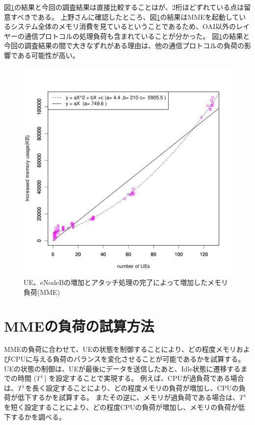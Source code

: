 \documentclass[a4j]{ujarticle}
\begin{document}
図\ref{fig:mme_memory}の結果と今回の調査結果は直接比較することはが、2桁ほどずれている点は留意すべきである。
上野さんに確認したところ、図\ref{fig:mme_memory}の結果はMMEを起動しているシステム全体のメモリ消費を見ているということであるため、OAI以外のレイヤーの通信プロトコルの処理負荷も含まれていることが分かった。
図\ref{fig:mme_memory}の結果と今回の調査結果の間で大きなずれがある理由は、他の通信プロトコルの負荷の影響である可能性が高い。
\begin{figure}[htbp]
  \centering
  \includegraphics[width=0.9\hsize]{mme_memory.pdf}
  \caption{UE、eNodeBの増加とアタッチ処理の完了によって増加したメモリ負荷(MME)}
  \label{fig:mme_memory}
\end{figure}

\clearpage
\section{MMEの負荷の試算方法}
\label{seq:estimate}
MMEの負荷に合わせて、UEの状態を制御することにより、どの程度メモリおよびCPUに与える負荷のバランスを変化させることが可能であるかを試算する。
UEの状態の制御は、UEが最後にデータを送信したあと、Idle状態に遷移するまでの時間 ($T^{\rm i}$) を設定することで実現する。
例えば、CPUが過負荷である場合は、$T^{\rm i}$を長く設定することにより、どの程度メモリの負荷が増加し、CPUの負荷が低下するかを試算する。
またその逆に、メモリが過負荷である場合は、$T^{\rm i}$を短く設定することにより、どの程度CPUの負荷が増加し、メモリの負荷が低下するかを調べる。
\end{document}

